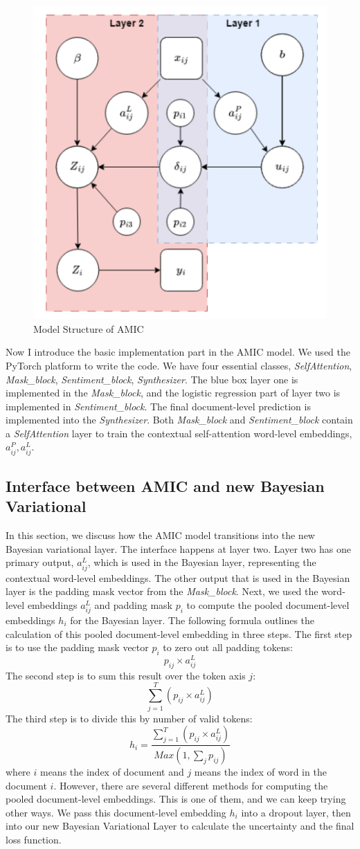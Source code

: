 \documentclass{article}
\begin{document}
\begin{figure}
    \centering
    \includegraphics[width=0.5\linewidth]{amic.png}
    \caption{Model Structure of AMIC}
    \label{fig:amic}
\end{figure}
Now I introduce the basic implementation part in the AMIC model. We used the PyTorch platform to write the code. We have four essential classes, \textit{SelfAttention}, \textit{Mask\_block}, \textit{Sentiment\_block}, \textit{Synthesizer}. The blue box layer one is implemented in the \textit{Mask\_block}, and the logistic regression part of layer two is implemented in \textit{Sentiment\_block}. The final document-level prediction is implemented into the \textit{Synthesizer}. Both \textit{Mask\_block} and \textit{Sentiment\_block} contain a \textit{SelfAttention} layer to train the contextual self-attention word-level embeddings, $a_{ij}^P, a_{ij}^L$. 

\subsection{Interface between AMIC and new Bayesian Variational}
In this section, we discuss how the AMIC model transitions into the new Bayesian variational layer. The interface happens at layer two. Layer two has one primary output, $a_{ij}^L$, which is used in the Bayesian layer, representing the contextual word-level embeddings. The other output that is used in the Bayesian layer is the padding mask vector from the \textit{Mask\_block}. Next, we used the word-level embeddings $a_{ij}^L$ and padding mask $p_i$ to compute the pooled document-level embeddings $h_i$ for the Bayesian layer. The following formula outlines the calculation of this pooled document-level embedding in three steps. The first step is to use the padding mask vector $p_{i}$ to zero out all padding tokens: $$p_{ij} \times a_{ij}^L$$ The second step is to sum this result over the token axis $j$: $$\sum_{j=1}^T (p_{ij} \times a_{ij}^L)$$ The third step is to divide this by number of valid tokens: $$h_i=\frac{\sum_{j=1}^T (p_{ij} \times a_{ij}^L)}{Max(1,\sum_j p_{ij})}$$ where $i$ means the index of document and $j$ means the index of word in the document $i$. However, there are several different methods for computing the pooled document-level embeddings. This is one of them, and we can keep trying other ways. We pass this document-level embedding $h_i$ into a dropout layer, then into our new Bayesian Variational Layer to calculate the uncertainty and the final loss function. 
\end{document}
